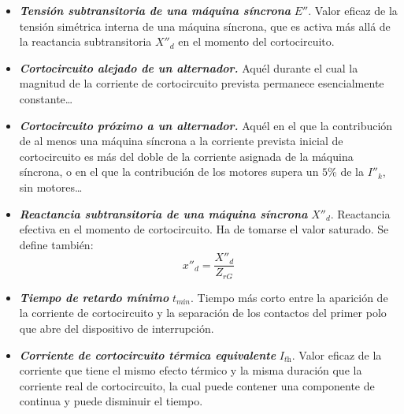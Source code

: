 \begin{itemize}
\begin{equation}
            \end{equation}
            \item \textbf{\textit{Tensión subtransitoria de una máquina síncrona}} $E''$. Valor eficaz de la tensión simétrica interna de una máquina síncrona, que es activa más allá de la reactancia subtransitoria $X''_\textit{d}$ en el momento del cortocircuito.
            \item \textbf{\textit{Cortocircuito alejado de un alternador.}} Aquél durante el cual la magnitud de la corriente de cortocircuito prevista permanece esencialmente constante\dots
            \item \textbf{\textit{Cortocircuito próximo a un alternador.}} Aquél en el que la contribución de al menos una máquina síncrona a la corriente prevista inicial de cortocircuito es más del doble de la corriente asignada de la máquina síncrona, o en el que la contribución de los motores supera un $5\!$\% de la $I''_\textit{k}$, sin motores\dots
            \item \textbf{\textit{Reactancia subtransitoria de una máquina síncrona}} $X''_\textit{d}$. Reactancia efectiva en el momento de cortocircuito. Ha de tomarse el valor saturado. Se define también:
            \begin{equation}
                x''_\textit{d} = \dfrac{X''_\textit{d}}{Z_\textit{rG}}
            \end{equation}
            \item \textbf{\textit{Tiempo de retardo mínimo}} $t_\textit{mín}$. Tiempo más corto entre la aparición de la corriente de cortocircuito y la separación de los contactos del primer polo que abre del dispositivo de interrupción.
            \item \textbf{\textit{Corriente de cortocircuito térmica equivalente}} $I_\textit{th}$. Valor eficaz de la corriente que tiene el mismo efecto térmico y la misma duración que la corriente real de cortocircuito, la cual puede contener una componente de continua y puede disminuir el tiempo.
        \end{itemize}


